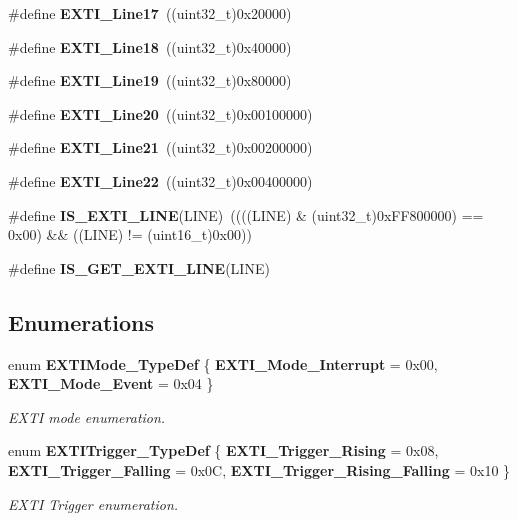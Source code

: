\begin{DoxyCompactItemize}
$$\item 
\#define \textbf{ E\+X\+T\+I\+\_\+\+Line17}~((uint32\+\_\+t)0x20000)
\item 
\#define \textbf{ E\+X\+T\+I\+\_\+\+Line18}~((uint32\+\_\+t)0x40000)
\item 
\#define \textbf{ E\+X\+T\+I\+\_\+\+Line19}~((uint32\+\_\+t)0x80000)
\item 
\#define \textbf{ E\+X\+T\+I\+\_\+\+Line20}~((uint32\+\_\+t)0x00100000)
\item 
\#define \textbf{ E\+X\+T\+I\+\_\+\+Line21}~((uint32\+\_\+t)0x00200000)
\item 
\#define \textbf{ E\+X\+T\+I\+\_\+\+Line22}~((uint32\+\_\+t)0x00400000)
\item 
\#define \textbf{ I\+S\+\_\+\+E\+X\+T\+I\+\_\+\+L\+I\+NE}(L\+I\+NE)~((((L\+I\+NE) \& (uint32\+\_\+t)0x\+F\+F800000) == 0x00) \&\& ((\+L\+I\+N\+E) != (uint16\+\_\+t)0x00))
\item 
\#define \textbf{ I\+S\+\_\+\+G\+E\+T\+\_\+\+E\+X\+T\+I\+\_\+\+L\+I\+NE}(L\+I\+NE)
\end{DoxyCompactItemize}
\subsection*{Enumerations}
\begin{DoxyCompactItemize}
\item 
enum \textbf{ E\+X\+T\+I\+Mode\+\_\+\+Type\+Def} \{ \textbf{ E\+X\+T\+I\+\_\+\+Mode\+\_\+\+Interrupt} = 0x00, 
\textbf{ E\+X\+T\+I\+\_\+\+Mode\+\_\+\+Event} = 0x04
 \}\begin{DoxyCompactList}\small\item\em E\+X\+TI mode enumeration. \end{DoxyCompactList}
\item 
enum \textbf{ E\+X\+T\+I\+Trigger\+\_\+\+Type\+Def} \{ \textbf{ E\+X\+T\+I\+\_\+\+Trigger\+\_\+\+Rising} = 0x08, 
\textbf{ E\+X\+T\+I\+\_\+\+Trigger\+\_\+\+Falling} = 0x0C, 
\textbf{ E\+X\+T\+I\+\_\+\+Trigger\+\_\+\+Rising\+\_\+\+Falling} = 0x10
 \}\begin{DoxyCompactList}\small\item\em E\+X\+TI Trigger enumeration. \end{DoxyCompactList}
\end{DoxyCompactItemize}
